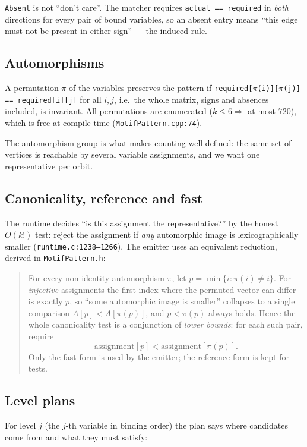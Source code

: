 \documentclass[11pt,a4paper]{article}
\newcommand{\code}[1]{\texttt{#1}}
\newcommand{\file}[1]{\texttt{#1}}
\begin{document}
\code{Absent} is not ``don't care''. The matcher requires
\code{actual == required} in \emph{both} directions for every pair of bound
variables, so an absent entry means ``this edge must not be present in either
sign'' --- the induced rule.

\subsection{Automorphisms}

A permutation $\pi$ of the variables preserves the pattern if
\code{required[$\pi$(i)][$\pi$(j)] == required[i][j]} for all $i,j$, i.e.\ the
whole matrix, signs and absences included, is invariant. All permutations are
enumerated ($k\le 6 \Rightarrow$ at most $720$), which is free at compile time
(\file{MotifPattern.cpp:74}).

The automorphism group is what makes counting well-defined: the same set of
vertices is reachable by several variable assignments, and we want one
representative per orbit.

\subsection{Canonicality, reference and fast}

The runtime decides ``is this assignment the representative?'' by the honest
$O(k!)$ test: reject the assignment if \emph{any} automorphic image is
lexicographically smaller (\file{runtime.c:1238--1266}). The emitter uses an
equivalent reduction, derived in \file{MotifPattern.h}:

\begin{quote}
For every non-identity automorphism $\pi$, let $p=\min\{i : \pi(i)\ne i\}$. For
\emph{injective} assignments the first index where the permuted vector can differ
is exactly $p$, so ``some automorphic image is smaller'' collapses to a single
comparison $A[p] < A[\pi(p)]$, and $p < \pi(p)$ always holds. Hence the whole
canonicality test is a conjunction of \emph{lower bounds}: for each such pair,
require
\[
  \mathrm{assignment}[p] < \mathrm{assignment}[\pi(p)].
\]
Only the fast form is used by the emitter; the reference form is kept for tests.
\end{quote}

\subsection{Level plans}

For level $j$ (the $j$-th variable in binding order) the plan says where
candidates come from and what they must satisfy:
\end{document}

